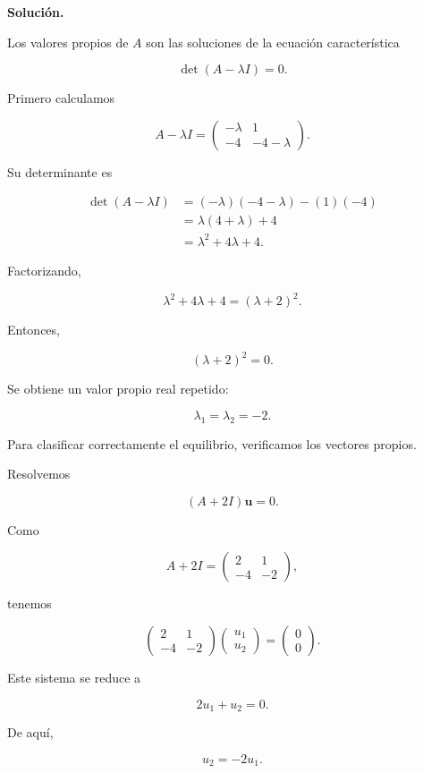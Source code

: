 \documentclass[a4paper,12pt]{article}
\newcommand{\solucion}{
\par\medskip
{\color{solutioncolor}\textbf{Solución.}}
\par
}
\begin{document}
\begin{enumerate}[leftmargin=*,
itemsep=0.8cm]
\begin{enumerate}[label=\alph*),
leftmargin=*,itemsep=0.5cm]
\solucion

Los valores propios de $A$
son las soluciones de la
ecuación característica

\[
\det(A-\lambda I)=0.
\]

Primero calculamos

\[
A-\lambda I=
\begin{pmatrix}
-\lambda&1\\
-4&-4-\lambda
\end{pmatrix}.
\]

Su determinante es

\begin{align*}
\det(A-\lambda I)
&=(-\lambda)(-4-\lambda)
 -(1)(-4)\\
&=\lambda(4+\lambda)+4\\
&=\lambda^2+4\lambda+4.
\end{align*}

Factorizando,

\[
\lambda^2+4\lambda+4
=(\lambda+2)^2.
\]

Entonces,

\[
(\lambda+2)^2=0.
\]

Se obtiene un valor propio
real repetido:

\[
\boxed{\lambda_1=\lambda_2=-2.}
\]

Para clasificar correctamente
el equilibrio, verificamos
los vectores propios.

Resolvemos

\[
(A+2I)\mathbf u=0.
\]

Como

\[
A+2I=
\begin{pmatrix}
2&1\\
-4&-2
\end{pmatrix},
\]

tenemos

\[
\begin{pmatrix}
2&1\\
-4&-2
\end{pmatrix}
\begin{pmatrix}
u_1\\u_2
\end{pmatrix}
=
\begin{pmatrix}
0\\0
\end{pmatrix}.
\]

Este sistema se reduce a

\[
2u_1+u_2=0.
\]

De aquí,

\[
u_2=-2u_1.
\]


\end{enumerate}
\end{enumerate}
\end{document}

